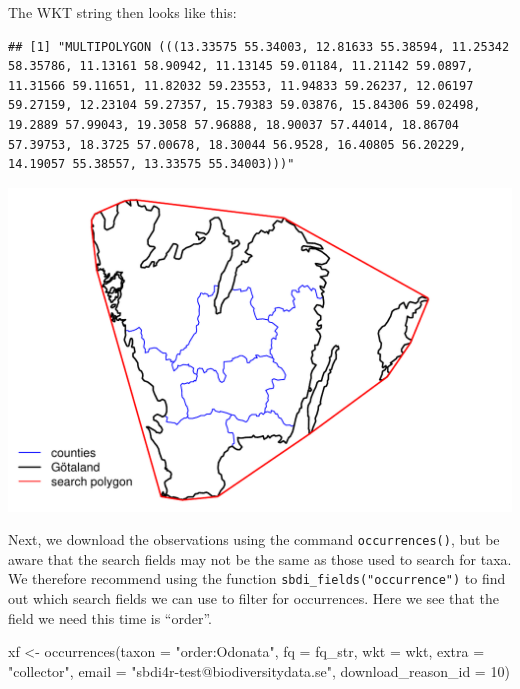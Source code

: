 \documentclass[
  10pt,
]{article}
\newenvironment{Shaded}{\begin{snugshade}}{\end{snugshade}}
\newcommand{\AttributeTok}[1]{\textcolor[rgb]{0.77,0.63,0.00}{#1}}
\newcommand{\DecValTok}[1]{\textcolor[rgb]{0.00,0.00,0.81}{#1}}
\newcommand{\FunctionTok}[1]{\textcolor[rgb]{0.00,0.00,0.00}{#1}}
\newcommand{\NormalTok}[1]{#1}
\newcommand{\OtherTok}[1]{\textcolor[rgb]{0.56,0.35,0.01}{#1}}
\newcommand{\StringTok}[1]{\textcolor[rgb]{0.31,0.60,0.02}{#1}}
\begin{document}
The WKT string then looks like this:

\begin{verbatim}
## [1] "MULTIPOLYGON (((13.33575 55.34003, 12.81633 55.38594, 11.25342 58.35786, 11.13161 58.90942, 11.13145 59.01184, 11.21142 59.0897, 11.31566 59.11651, 11.82032 59.23553, 11.94833 59.26237, 12.06197 59.27159, 12.23104 59.27357, 15.79383 59.03876, 15.84306 59.02498, 19.2889 57.99043, 19.3058 57.96888, 18.90037 57.44014, 18.86704 57.39753, 18.3725 57.00678, 18.30044 56.9528, 16.40805 56.20229, 14.19057 55.38557, 13.33575 55.34003)))"
\end{verbatim}

\includegraphics{r-tools-tutorial_files/figure-latex/searchpoly-1.pdf}

Next, we download the observations using the command \texttt{occurrences()},
but be aware that the search fields may not be the same as those used to
search for taxa. We therefore recommend using the function
\texttt{sbdi\_fields("occurrence")} to find out which search fields we can use
to filter for occurrences. Here we see that the field we need this time
is ``order''.

\begin{Shaded}
\begin{Highlighting}[]
\NormalTok{xf }\OtherTok{\textless{}{-}} \FunctionTok{occurrences}\NormalTok{(}\AttributeTok{taxon =} \StringTok{"order:Odonata"}\NormalTok{, }
                  \AttributeTok{fq =}\NormalTok{ fq\_str,}
                  \AttributeTok{wkt =}\NormalTok{ wkt,}
                  \AttributeTok{extra =} \StringTok{"collector"}\NormalTok{,}
                  \AttributeTok{email =} \StringTok{"sbdi4r{-}test@biodiversitydata.se"}\NormalTok{, }
                  \AttributeTok{download\_reason\_id =} \DecValTok{10}\NormalTok{)}
\end{Highlighting}
\end{Shaded}
\end{document}

